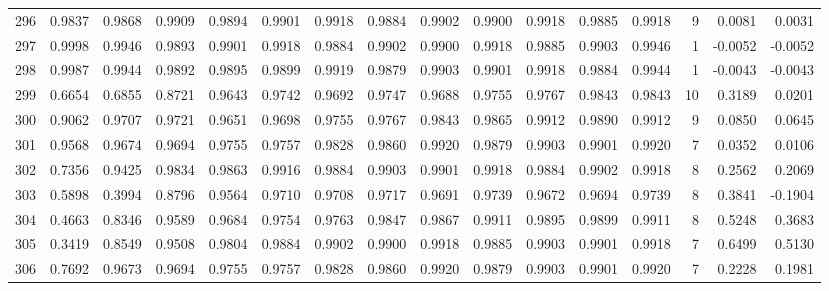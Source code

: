 \begin{tabular}{lrrrrrrrrrrrrrrr}
296 &      0.9837 &  0.9868 &  0.9909 &  0.9894 &  0.9901 &  0.9918 &  0.9884 &  0.9902 &  0.9900 &  0.9918 &   0.9885 &     0.9918 &      9 &                    0.0081 &                     0.0031 \\
297 &      0.9998 &  0.9946 &  0.9893 &  0.9901 &  0.9918 &  0.9884 &  0.9902 &  0.9900 &  0.9918 &  0.9885 &   0.9903 &     0.9946 &      1 &                   -0.0052 &                    -0.0052 \\
298 &      0.9987 &  0.9944 &  0.9892 &  0.9895 &  0.9899 &  0.9919 &  0.9879 &  0.9903 &  0.9901 &  0.9918 &   0.9884 &     0.9944 &      1 &                   -0.0043 &                    -0.0043 \\
299 &      0.6654 &  0.6855 &  0.8721 &  0.9643 &  0.9742 &  0.9692 &  0.9747 &  0.9688 &  0.9755 &  0.9767 &   0.9843 &     0.9843 &     10 &                    0.3189 &                     0.0201 \\
300 &      0.9062 &  0.9707 &  0.9721 &  0.9651 &  0.9698 &  0.9755 &  0.9767 &  0.9843 &  0.9865 &  0.9912 &   0.9890 &     0.9912 &      9 &                    0.0850 &                     0.0645 \\
301 &      0.9568 &  0.9674 &  0.9694 &  0.9755 &  0.9757 &  0.9828 &  0.9860 &  0.9920 &  0.9879 &  0.9903 &   0.9901 &     0.9920 &      7 &                    0.0352 &                     0.0106 \\
302 &      0.7356 &  0.9425 &  0.9834 &  0.9863 &  0.9916 &  0.9884 &  0.9903 &  0.9901 &  0.9918 &  0.9884 &   0.9902 &     0.9918 &      8 &                    0.2562 &                     0.2069 \\
303 &      0.5898 &  0.3994 &  0.8796 &  0.9564 &  0.9710 &  0.9708 &  0.9717 &  0.9691 &  0.9739 &  0.9672 &   0.9694 &     0.9739 &      8 &                    0.3841 &                    -0.1904 \\
304 &      0.4663 &  0.8346 &  0.9589 &  0.9684 &  0.9754 &  0.9763 &  0.9847 &  0.9867 &  0.9911 &  0.9895 &   0.9899 &     0.9911 &      8 &                    0.5248 &                     0.3683 \\
305 &      0.3419 &  0.8549 &  0.9508 &  0.9804 &  0.9884 &  0.9902 &  0.9900 &  0.9918 &  0.9885 &  0.9903 &   0.9901 &     0.9918 &      7 &                    0.6499 &                     0.5130 \\
306 &      0.7692 &  0.9673 &  0.9694 &  0.9755 &  0.9757 &  0.9828 &  0.9860 &  0.9920 &  0.9879 &  0.9903 &   0.9901 &     0.9920 &      7 &                    0.2228 &                     0.1981 \\

\end{tabular}
